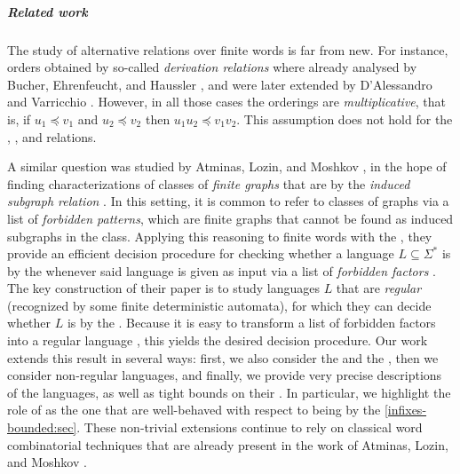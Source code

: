 
\subparagraph{Related work} The study of alternative 
relations over finite words is far from new. For instance, orders obtained by
so-called \emph{derivation relations} where already analysed by Bucher,
Ehrenfeucht, and Haussler \cite{BUEUD85}, and were later extended by
D'Alessandro and Varricchio \cite{ALVA03,ALVA06}. However, in all those cases
the orderings are \emph{multiplicative}, that is, if $u_1 \preceq v_1$ and $u_2
\preceq v_2$ then $u_1u_2 \preceq v_1v_2$. This assumption does not hold for
the , , and  relations.

A similar question was studied by Atminas, Lozin, and Moshkov \cite{ALM17}, in
the hope of finding characterizations of classes of \emph{finite graphs} that
are  by the \emph{induced subgraph relation}
\cite[Section 7]{ALM17}. In this setting, it is common to refer to classes of
graphs via a list of \emph{forbidden patterns}, which are finite graphs that
cannot be found as induced subgraphs in the class. Applying this reasoning to
finite words with the , they provide an efficient decision
procedure for checking whether a language $L \subseteq \Sigma^*$ is
 by the  whenever said language is
given as input via a list of \emph{forbidden factors} \cite[Theorem 1, Theorem
2]{ALM17}. The key construction of their paper is to study languages $L$ that
are \emph{regular} (recognized by some finite deterministic automata), for
which they can decide whether $L$ is  by the  \cite[Theorem 1]{ALM17}. Because it is easy to transform a list of
forbidden factors into a regular language \cite[Theorem 1]{ALM17}, this yields
the desired decision procedure. Our work extends this result in several ways:
first, we also consider the  and the ,
then we consider non-regular languages, and finally, we provide very precise
descriptions of the  languages, as well as tight bounds
on their . In particular, we highlight the role of
 as the one that are well-behaved with respect to being
 by the  \cref{infixes-bounded:sec}.
These non-trivial extensions continue to rely
on classical word combinatorial techniques that are already present in the work
of Atminas, Lozin, and Moshkov \cite[Section 3]{ALM17}.

